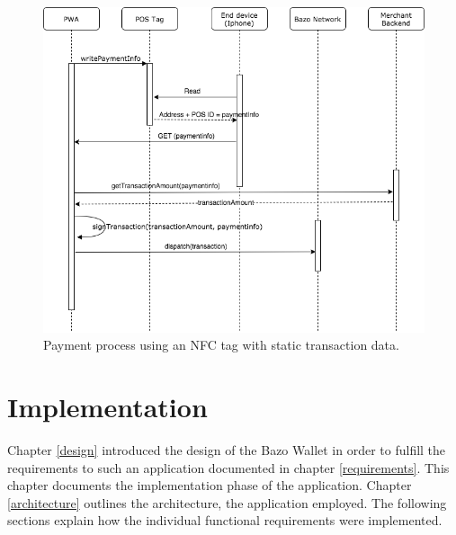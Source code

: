 \begin{figure}
\centering
\includegraphics[width=1\textwidth]{diagrams/POS_flow.png}
\caption{\label{fig:POS}Payment process using an NFC tag with static transaction data.}
\end{figure}








\chapter{Implementation}
Chapter \ref{design} introduced the design of the Bazo Wallet in order to fulfill the requirements to such an application documented in chapter \ref{requirements}. This chapter documents the implementation phase of the application. Chapter  \ref{architecture} outlines the architecture, the application employed. The following sections explain how the individual functional requirements were implemented.
